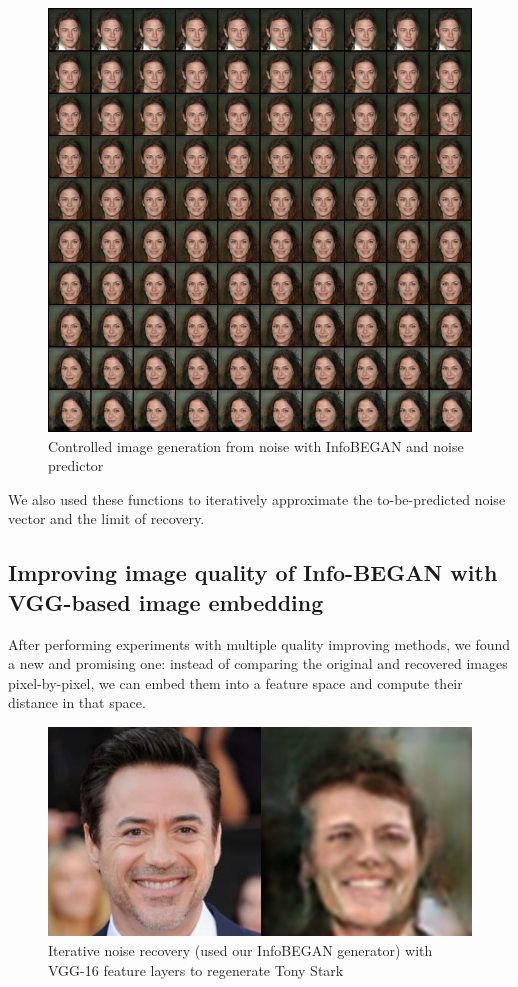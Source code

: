 \documentclass{egpubl}
\begin{document}
\begin{figure}[!htb]
	\centering
	\includegraphics[width=1\linewidth]{pic/InfoBegan_varied_result}
	\caption{Controlled image generation from noise with InfoBEGAN and noise predictor}
	
\end{figure}

We also used these functions to iteratively approximate the to-be-predicted noise vector and the limit of recovery.

\subsection{Improving image quality of Info-BEGAN with VGG-based image embedding}

After performing experiments with multiple quality improving methods, we found a new and promising one: instead of comparing the original and recovered images pixel-by-pixel, we can embed them into a feature space and compute their distance in that space.
\\

\begin{figure}[!htb]
	\centering
	\includegraphics[width=1\linewidth]{pic/InfoBEGAN_tony_recovered_VGG16}
	\caption{Iterative noise recovery (used our InfoBEGAN generator) with VGG-16 feature layers to regenerate Tony Stark}

\end{figure}
\end{document}
